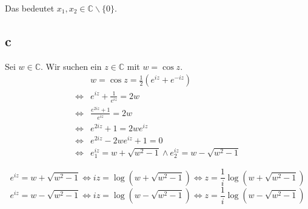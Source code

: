 \documentclass[a4paper,10pt]{article}
\begin{document}
Das bedeutet $x_1, x_2 \in \mathbb{C} \backslash \{0\}$.

\subsection*{c}

Sei $w \in \mathbb{C}$.
Wir suchen ein $z \in \mathbb{C}$ mit $w = \cos z$.
\begin{align}
 & w = \cos z = \frac{1}{2}(e^{iz} + e^{-iz})\\
 \Leftrightarrow & e^{iz} + \frac{1}{e^{iz}} = 2w\\
 \Leftrightarrow & \frac{e^{2iz} + 1}{e^{iz}} = 2w\\
 \Leftrightarrow & e^{2iz} + 1 = 2we^{iz}\\
 \Leftrightarrow & e^{2iz} - 2we^{iz} + 1 = 0\\
 \Leftrightarrow & e^{iz}_1 = w + \sqrt{w^2 - 1} \land e^{iz}_2 = w - \sqrt{w^2 - 1}
\end{align}

\begin{equation}
 e^{iz} = w + \sqrt{w^2 - 1} \Leftrightarrow iz = \log (w + \sqrt{w^2 - 1}) \Leftrightarrow z = \frac{1}{i}\log (w + \sqrt{w^2 - 1})
\end{equation}
\begin{equation}
 e^{iz} = w - \sqrt{w^2 - 1} \Leftrightarrow iz = \log (w - \sqrt{w^2 - 1}) \Leftrightarrow z = \frac{1}{i}\log (w - \sqrt{w^2 - 1})
\end{equation}
\end{document}
